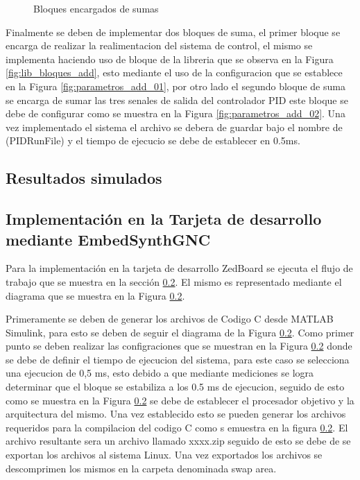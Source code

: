 \begin{figure}[htbp]
    \caption{Bloques encargados de sumas}
    \label{fig:arreglo_add}
\end{figure}

Finalmente se deben de implementar dos bloques de suma, el primer bloque se encarga de realizar la realimentacion del sistema de control, el mismo se implementa haciendo uso de bloque de la libreria que se observa en la Figura \ref{fig:lib_bloques_add}, esto mediante el uso de la configuracion que se establece en la Figura \ref{fig:parametros_add_01}, por otro lado el segundo bloque de suma se encarga de sumar las tres senales de salida del controlador PID este bloque se debe de configurar como se muestra en la Figura \ref{fig:parametros_add_02}. Una vez implementado el sistema el archivo se debera de guardar bajo el nombre de (PIDRunFile) y el tiempo de ejecucio se debe de establecer en 0.5ms. 

\subsection{Resultados simulados}\label{subsub:resultados_simulados_PID}

\subsection{Implementación en la Tarjeta de desarrollo mediante EmbedSynthGNC}

Para la implementación en la tarjeta de desarrollo ZedBoard se ejecuta el flujo de trabajo que se muestra en la sección \ref{}. El mismo es representado mediante el diagrama que se muestra en la Figura \ref{}.

Primeramente se deben de generar los archivos de Codigo C desde MATLAB Simulink, para esto se deben de seguir el diagrama de la Figura \ref{}. Como primer punto se deben realizar las configraciones que se muestran en la Figura \ref{} donde se debe de definir el tiempo de ejecucion del sistema, para este caso se selecciona una ejecucion de 0,5 ms, esto debido a que mediante mediciones se logra determinar que el bloque se estabiliza a los 0.5 ms de ejecucion, seguido de esto como se muestra en la Figura \ref{} se debe de establecer el procesador objetivo y la arquitectura del mismo. Una vez establecido esto se pueden generar los archivos requeridos para la compilacion del codigo C como s emuestra en la figura \ref{}. El archivo resultante sera un archivo llamado xxxx.zip seguido de esto se debe de  se exportan los archivos al sistema Linux. Una vez exportados los archivos se descomprimen los mismos en la carpeta denominada swap area.


